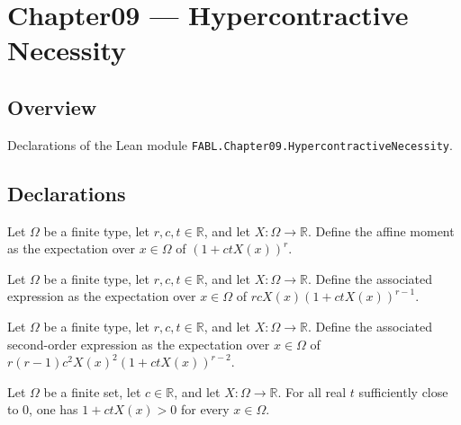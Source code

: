 \chapter{Chapter09 — Hypercontractive Necessity}
\section{Overview}

Declarations of the Lean module \texttt{FABL.Chapter09.HypercontractiveNecessity}.

\section{Declarations}

\begin{definition}
\label{FABL.affineMoment}
\leanok
Let $\Omega$ be a finite type, let $r,c,t\in\mathbb R$, and let $X:\Omega\to\mathbb R$.
Define the affine moment as the expectation over $x\in\Omega$ of $(1+ctX(x))^r$.
\end{definition}

\begin{definition}
\label{FABL.affineMomentDeriv}
\leanok
Let $\Omega$ be a finite type, let $r,c,t\in\mathbb R$, and let $X:\Omega\to\mathbb R$.
Define the associated expression as the expectation over $x\in\Omega$ of
$rcX(x)(1+ctX(x))^{r-1}$.
\end{definition}

\begin{definition}
\label{FABL.affineMomentDeriv2}
\leanok
Let $\Omega$ be a finite type, let $r,c,t\in\mathbb R$, and let $X:\Omega\to\mathbb R$.
Define the associated second-order expression as the expectation over $x\in\Omega$ of
$r(r-1)c^2X(x)^2(1+ctX(x))^{r-2}$.
\end{definition}

\begin{theorem}
\label{FABL.eventually_affine_positive}
\leanok
{}
Let $\Omega$ be a finite set, let $c\in\mathbb R$, and let $X:\Omega\to\mathbb R$. For
all real $t$ sufficiently close to $0$, one has $1+ctX(x)>0$ for every $x\in\Omega$.
\end{theorem}

